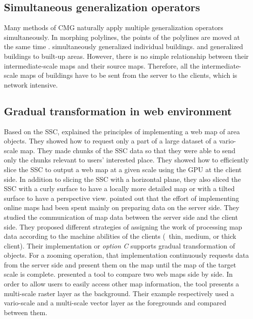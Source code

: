 \documentclass[twocolumn]{svjour3}          %
\begin{document}
\subsection{Simultaneous generalization operators}


Many methods of CMG naturally apply 
multiple generalization operators simultaneously.
In morphing polylines, the points of the polylines are moved at the same time
\citep[\eg][]{Noellenburg2008,Li2017Annealing}.
\citet{Li2017_Building} simultaneously generalized individual buildings.
\citet{Peng2017Building} and \citet{Touya2017Progressive}
generalized buildings to built-up areas.
However, there is no simple relationship 
between their intermediate-scale maps and their source maps.
Therefore, all the intermediate-scale maps of buildings have to be
sent from the server to the clients,
which is network intensive.



\subsection{Gradual transformation in web environment}

Based on the SSC, \citet{Meijers2020Web} explained the principles of 
implementing a web map of area objects.
They showed how to request only a part of a large dataset of a vario-scale map.
They made chunks of the SSC data
so that they were able to send only the chunks relevant 
to users' interested place.
They showed how to efficiently slice the SSC 
to output a web map at a given scale 
using the GPU at the client side.
In addition to slicing the SSC with a horizontal plane,
they also sliced the SSC with a curly surface 
to have a locally more detailed map
or with a tilted surface to have a perspective view.
\citet{Huang2016Webmap} pointed out that
the effort of implementing online maps 
had been spent mainly on preparing data on the server side.
They studied the communication of map data 
between the server side and the client side.
They proposed different strategies of assigning 
the work of processing map data
according to the machine abilities of the clients
(\ie~thin, medium, or thick client).
Their implementation or \emph{option C}
supports gradual transformation of objects.
For a zooming operation, that implementation
continuously requests data from the server side 
and present them on the map 
until the map of the target scale is complete.
\citet{Peng2020Viewer} presented a tool to compare two web maps side by side.
In order to allow users to easily access other map information,
the tool presents a multi-scale raster layer as the background.
Their example respectively used a vario-scale and a multi-scale 
vector layer as the foregrounds and compared between them.
\end{document}
